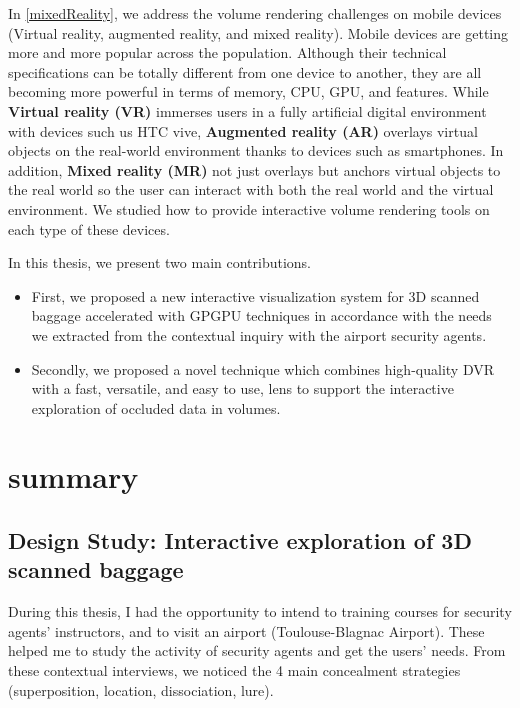 In \autoref{mixedReality}, we address the volume rendering challenges on mobile devices (Virtual reality, augmented reality, and mixed reality). Mobile devices are getting more and more popular across the population. Although their technical specifications can be totally different from one device to another, they are all becoming more powerful in terms of memory, CPU, GPU, and features. While \textbf{Virtual reality (VR)} immerses users in a fully artificial digital environment with devices such us HTC vive, \textbf {Augmented reality (AR)} overlays virtual objects on the real-world environment thanks to devices such as smartphones. In addition, \textbf {Mixed reality (MR)} not just overlays but anchors virtual objects to the real world so the user can interact with both the real world and the virtual environment. We studied how to provide interactive volume rendering tools on each type of these devices.



In this thesis, we present two main contributions.  

\begin{itemize}

\item First, we proposed a new interactive visualization system for 3D scanned baggage accelerated with GPGPU techniques in accordance with the needs we extracted from the contextual inquiry with the airport security agents. 

\item Secondly, we proposed a novel technique which combines high-quality DVR with a fast, versatile, and easy to use, lens to support the interactive exploration of occluded data in volumes.

\end{itemize}



\section{summary} 

\subsection{ Design Study: Interactive exploration of 3D scanned baggage } 

During this thesis, I had the opportunity to intend to training courses for security agents' instructors, and to visit an airport (Toulouse-Blagnac Airport). These helped me to study the activity of security agents and get the users' needs. From these contextual interviews, we noticed the 4 main concealment strategies (superposition, location, dissociation, lure).  

